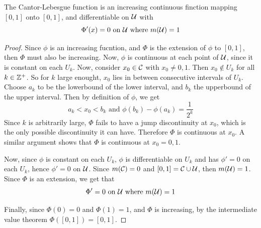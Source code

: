 \begin{theorem}\label{8.7.2}
    The Cantor-Lebesgue function is an increasing continuous finction mapping
    $[0,1]$ onto $[0,1]$, and differentiable on $\mathcal{U}$ with
    \begin{equation*}
        \Phi'(x)=0 \text{ on } \mathcal{U} \text{ where } m(\mathcal{U})=1
    \end{equation*}
\end{theorem}
\begin{proof}
    Since $\phi$ is an increasing fucntion, and  $\Phi$ is the extension of
    $\phi$ to  $[0,1]$, then $\Phi$ must also be increasing. Now,  $\phi$ is
    continuous at each point of  $\mathcal{U}$, since it is constant on each  $U_k$.
    Now, consider  $x_0 \in \mathcal{C}$ with $x_0 \neq 0,1$. Then $x_0 \notin U_k$ for
    all $k \in \mathbb{Z}^+$. So for  $k$ large enought,  $x_0$ lies in between
    consecutive intervals of $U_k$. Choose  $a_k$ to be the lowerbound of the
    lower interval, and  $b_k$ the upperbound of the upper interval. Then by
    definition of  $\phi$, we get
    \begin{equation*}
        a_k<x_0<b_k \text{ and } \phi(b_k)-\phi(a_k)=\frac{1}{2^k}
    \end{equation*}
    Since $k$ is arbitrarily large, $\Phi$ fails to have a jump discontinuity at
     $x_0$, which is the only possible discontinuity it can have. Therefore
     $\Phi$ is continuous at  $x_0$. A similar argument shows that $\Phi$ is
     continuous at $x_0=0,1$.

     Now, since $\phi$ is constant on each  $U_k$,  $\phi$ is differentiable on
      $U_k$ and has  $\phi'=0$ on each  $U_k$, hence  $\phi'=0$ on $\mathcal{U}$. Since
      $m(\mathcal{C})=0$ and $[0,1]=\mathcal{C} \cup \mathcal{U}$, then $m(\mathcal{U})=1$. Since $\Phi$ is an
      extension, we get that
      \begin{equation*}
          \Phi'=0 \text{ on } \mathcal{U} \text{ where } m(\mathcal{U})=1
      \end{equation*}

      Finally, since $\Phi(0)=0$ and $\Phi(1)=1$, and $\Phi$ is increasing, by
      the intermediate value theorem $\Phi([0,1])=[0,1]$.
\end{proof}

